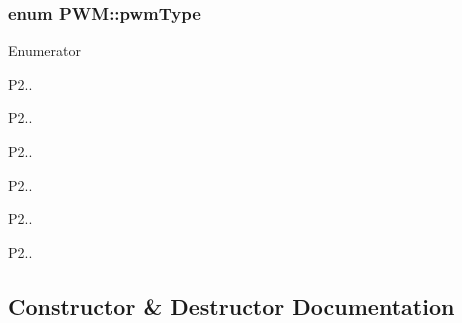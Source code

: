 \subsubsection[{\texorpdfstring{pwm\+Type}{pwmType}}]{\setlength{\rightskip}{0pt plus 5cm}enum {\bf P\+W\+M\+::pwm\+Type}}\hypertarget{classPWM_a4a7c14d2027c2cc508d4ff7abfe79ae7}{}\label{classPWM_a4a7c14d2027c2cc508d4ff7abfe79ae7}
\begin{Desc}
\item[Enumerator]\par
\begin{description}
\item[{\em 
pwm1\hypertarget{classPWM_a4a7c14d2027c2cc508d4ff7abfe79ae7ae9204765ea1148a6e9e5ae736dd5125c}{}\label{classPWM_a4a7c14d2027c2cc508d4ff7abfe79ae7ae9204765ea1148a6e9e5ae736dd5125c}
}]P2.. \item[{\em 
pwm2\hypertarget{classPWM_a4a7c14d2027c2cc508d4ff7abfe79ae7a6915379c35fd961109595bfc851e881c}{}\label{classPWM_a4a7c14d2027c2cc508d4ff7abfe79ae7a6915379c35fd961109595bfc851e881c}
}]P2.. \item[{\em 
pwm3\hypertarget{classPWM_a4a7c14d2027c2cc508d4ff7abfe79ae7aa24887ef4639816c895fc2b9636a3df5}{}\label{classPWM_a4a7c14d2027c2cc508d4ff7abfe79ae7aa24887ef4639816c895fc2b9636a3df5}
}]P2.. \item[{\em 
pwm4\hypertarget{classPWM_a4a7c14d2027c2cc508d4ff7abfe79ae7a700468106205ca486064cdfe85b7a48a}{}\label{classPWM_a4a7c14d2027c2cc508d4ff7abfe79ae7a700468106205ca486064cdfe85b7a48a}
}]P2.. \item[{\em 
pwm5\hypertarget{classPWM_a4a7c14d2027c2cc508d4ff7abfe79ae7a6292df88727966ee9ee6236750ea985e}{}\label{classPWM_a4a7c14d2027c2cc508d4ff7abfe79ae7a6292df88727966ee9ee6236750ea985e}
}]P2.. \item[{\em 
pwm6\hypertarget{classPWM_a4a7c14d2027c2cc508d4ff7abfe79ae7aa08486b79f7e12af820716dff6c00465}{}\label{classPWM_a4a7c14d2027c2cc508d4ff7abfe79ae7aa08486b79f7e12af820716dff6c00465}
}]P2.. \end{description}
\end{Desc}


\subsection{Constructor \& Destructor Documentation}
